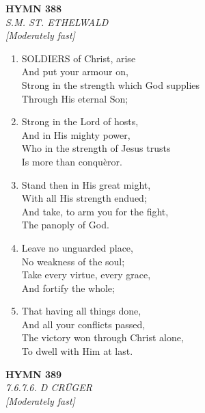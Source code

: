 \documentclass[11pt,a4paper]{article}
\begin{document}
\newpage
\begin{center}
    {\Large \textbf{HYMN 388}}
    \\
    \textit{S.M. ST. ETHELWALD}
    \\
    \textit{\small [Moderately fast]}
\end{center}
\vspace{1em}

\begin{enumerate}
    \item SOLDIERS of Christ, arise \\
        And put your armour on, \\
        Strong in the strength which God supplies \\
        Through His eternal Son;

    \item Strong in the Lord of hosts, \\
        And in His mighty power, \\
        Who in the strength of Jesus trusts \\
        Is more than conqu\`eror.

    \item Stand then in His great might, \\
        With all His strength endued; \\
        And take, to arm you for the fight, \\
        The panoply of God.

    \item Leave no unguarded place, \\
        No weakness of the soul; \\
        Take every virtue, every grace, \\
        And fortify the whole;

    \item That having all things done, \\
        And all your conflicts passed, \\
        The victory won through Christ alone, \\
        To dwell with Him at last.

\end{enumerate}

\newpage
\begin{center}
    {\Large \textbf{HYMN 389}}
    \\
    \textit{7.6.7.6. D CR\"{U}GER}
    \\
    \textit{\small [Moderately fast]}
\end{center}
\vspace{1em}
\end{document}
